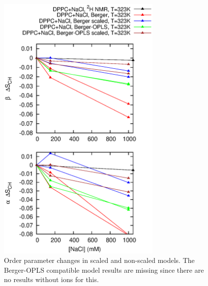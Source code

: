 \documentclass[pre,aps,floatfix,authordate1-4,twocolumn]{revtex4-1}
\begin{document}



\begin{figure}[]
  \centering
  \includegraphics[width=8cm]{../Fig/OrderParameterIONSchangesSCALED.eps} %
  \caption{\label{OPchangesSCALED}
    Order parameter changes in scaled and non-scaled models. The Berger-OPLS compatible model results are missing since there are
    no results without ions for this.
}
\end{figure}
\end{document}
